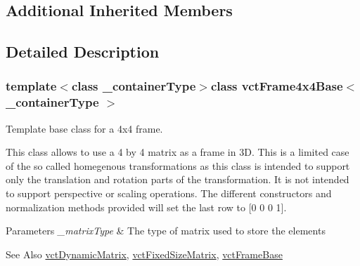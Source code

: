 \subsection*{Additional Inherited Members}


\subsection{Detailed Description}
\subsubsection*{template$<$class \-\_\-container\-Type$>$class vct\-Frame4x4\-Base$<$ \-\_\-container\-Type $>$}

Template base class for a 4x4 frame. 

This class allows to use a 4 by 4 matrix as a frame in 3\-D. This is a limited case of the so called homegenous transformations as this class is intended to support only the translation and rotation parts of the transformation. It is not intended to support perspective or scaling operations. The different constructors and normalization methods provided will set the last row to \mbox{[}0 0 0 1\mbox{]}.


\begin{DoxyParams}{Parameters}
{\em \-\_\-matrix\-Type} & The type of matrix used to store the elements\\
\hline
\end{DoxyParams}
\begin{DoxySeeAlso}{See Also}
\hyperlink{classvct_dynamic_matrix}{vct\-Dynamic\-Matrix}, \hyperlink{classvct_fixed_size_matrix}{vct\-Fixed\-Size\-Matrix}, \hyperlink{classvct_frame_base}{vct\-Frame\-Base} 
\end{DoxySeeAlso}


